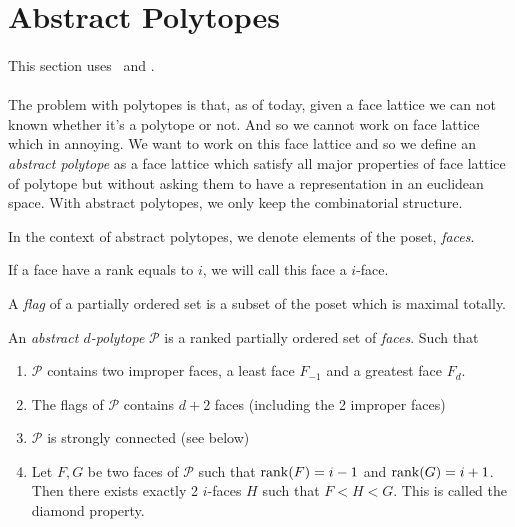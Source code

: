 \section{Abstract Polytopes}

\paragraph{}
This section uses~\cite{incidenceGeometry} and \cite{abstractRegularPolytopes}.

\paragraph{}
The problem with polytopes is that, as of today, given a face lattice we can not known whether it's a polytope or not. And so we cannot work on face lattice which in annoying. We want to work on this face lattice and so we define an \textit{abstract polytope} as a face lattice which satisfy all major properties of face lattice of polytope but without asking them to have a representation in an euclidean space. With abstract polytopes, we only keep the combinatorial structure.



\begin{definition}
  In the context of abstract polytopes, we denote elements of the poset, \textit{faces}.
\end{definition}

\begin{definition}[$i$-face]
  If a face have a rank equals to $i$, we will call this face a $i$-face.
\end{definition}

\begin{definition}
  A \textit{flag} of a partially ordered set is a subset of the poset which is maximal totally.
\end{definition}

\begin{definition}
  An \textit{abstract $d$-polytope} $\mathcal P$ is a ranked partially ordered set of \textit{faces}. Such that
  \begin{enumerate}
    \item $\mathcal P$ contains two improper faces, a least face $F_{-1}$ and a greatest face $F_d$.
    \item The flags of $\mathcal P$ contains $d + 2$ faces (including the 2 improper faces)
    \item $\mathcal P$ is strongly connected (see below)
    \item Let $F, G$ be two faces of $\mathcal P$ such that $\operatorname{rank}(F) = i - 1$ and $\operatorname{rank}(G) = i + 1$. Then there exists exactly 2 $i$-faces $H$ such that $F < H < G$. This is called the diamond property.
  \end{enumerate}
\end{definition}

